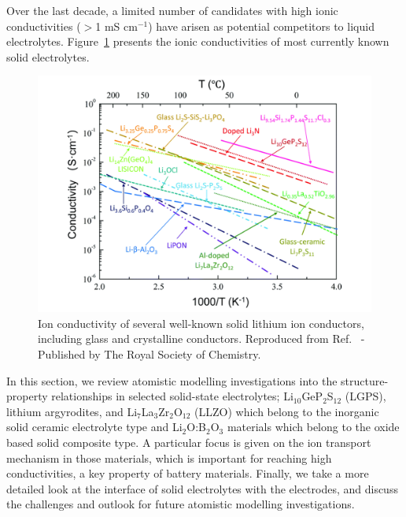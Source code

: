 \documentclass[../main.tex]{subfiles}
\begin{document}
Over the last decade, a limited number of candidates with high ionic conductivities ($>$1 mS cm$^{-1}$) have arisen as potential competitors to liquid electrolytes.\cite{kanno_synthesis_2000, murayama_synthesis_2002, murayama_material_2004, minafra_influence_2019,bron_li_2013,whiteley_empowering_2014,huang_superionic_2019,yamane_crystal_2007,homma_crystal_2011} Figure~\ref{fig:conductivity} presents the ionic conductivities of most currently known solid electrolytes.\cite{Zhang2018se_review}

\begin{figure}[htbp]
    \centering
    \includegraphics[scale=0.55]{figures/solid_electrolytes.pdf}
    \caption{Ion conductivity of several well-known solid lithium ion conductors, including glass and crystalline conductors. Reproduced from Ref.~ - Published by The Royal Society of Chemistry.}
    \label{fig:conductivity}
\end{figure}

In this section, we review atomistic modelling investigations into the structure-property relationships in selected solid-state electrolytes; Li$_{10}$GeP$_2$S$_{12}$ (LGPS), lithium argyrodites, and Li$_7$La$_3$Zr$_2$O$_{12}$ (LLZO) which belong to the inorganic solid ceramic electrolyte type and Li$_{2}$O:B$_{2}$O$_{3}$ materials which belong to the oxide based solid composite type. A particular focus is given on the ion transport mechanism in those materials, which is important for reaching high conductivities, a key property of battery materials. Finally, we take a more detailed look at the interface of solid electrolytes with the electrodes, and discuss the challenges and outlook for future atomistic modelling investigations.
\end{document}
